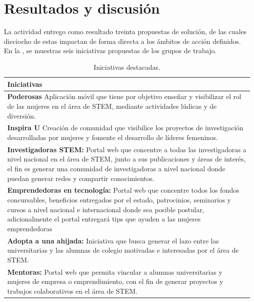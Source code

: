 \documentclass[spanish]{textolivre}
\begin{document}
\section{Resultados y discusión}

La actividad entrego como resultado treinta propuestas de solución, de las cuales dieciocho de estas impactan de forma directa a los ámbitos de acción definidos.
En la , se muestras seis iniciativas propuestas de los grupos de trabajo.

\begin{table}[htpb]
\centering
\begin{threeparttable}
\caption{Iniciativas destacadas.}\label{tbl02}
\begin{tabular}{p{\textwidth}}
\toprule
Iniciativas\\ 
\midrule
\textbf{Poderosas} Aplicación móvil que tiene por objetivo enseñar y visibilizar el rol de las mujeres en el área de STEM, mediante actividades lúdicas y de diversión.\\ 
\textbf {Inspira U } Creación de comunidad que visibilice los proyectos de investigación desarrolladas por mujeres y fomente el desarrollo de líderes femeninos.\\ 
\textbf {Investigadoras STEM:} Portal web que concentre a todas las investigadoras a nivel nacional en el área de STEM, junto a sus publicaciones y áreas de interés, el fin es generar una comunidad de investigadoras a nivel nacional donde puedan generar redes y compartir conocimientos.\\ 
\textbf {Emprendedoras en tecnología: } Portal web que concentre todos los fondos concursables, beneficios entregados por el estado, patrocinios, seminarios y cursos  a nivel nacional e internacional donde sea posible postular, adicionalmente el portal entregará tips que ayuden a las mujeres emprendedoras\\ 
\textbf {Adopta a una ahijada:}  Iniciativa que busca generar el lazo entre las universitarias y las alumnas de colegio motivadas e interesadas por el área de STEM.\\ 
\textbf {Mentoras:} Portal web que permita vincular a alumnas universitarias y mujeres de empresa o emprendimiento, con el fin de generar proyectos y trabajos colaborativos en el área de STEM.\\
\bottomrule
\end{tabular}
\end{threeparttable}
\end{table}
\end{document}
